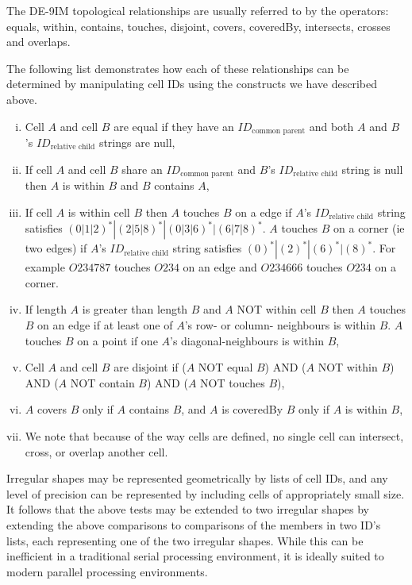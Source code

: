 \documentclass[12pt]{iopart}
\newcommand{\IDparent}{ID_{\text{common~parent}}}
\newcommand{\IDchild}{ID_{\text{relative~child}}}
\begin{document}
The DE-9IM topological relationships are usually referred to by the operators: equals, within, contains, touches, disjoint, covers, coveredBy, intersects, crosses and overlaps. 

The following list demonstrates how each of these relationships can be determined by manipulating cell IDs using the constructs we have described above.

\begin{enumerate}[(i)]
    \item Cell $A$ and cell $B$ are equal if they have an $\IDparent$ and both $A$ and $B$'s $\IDchild$ strings are null,
    \item If cell $A$ and cell $B$ share an $\IDparent$ and $B$'s $\IDchild$ string is null then $A$ is within $B$ and $B$ contains $A$, 
    \item If cell $A$ is within cell $B$ then $A$ touches $B$ on a edge if  $A$'s $\IDchild$ string satisfies $(0 | 1 | 2)^* | (2 | 5 | 8)^* | (0 | 3 | 6)^* | (6 | 7 | 8)^*$. $A$ touches $B$ on a corner (ie two edges) if $A$'s $\IDchild$ string satisfies $( 0 )^* | (2 )^* | ( 6 )^* | ( 8 )^*$. For example $O234787$ touches $O234$ on an edge and $O234666$ touches $O234$ on a corner.
    \item If length $A$ is greater than length $B$ and $A$ NOT within cell $B$ then $A$ touches $B$ on an edge if at least one of $A$'s row- or column- neighbours is within $B$.   $A$ touches $B$ on a point if one $A$'s diagonal-neighbours is within $B$,
    \item Cell $A$ and cell $B$ are disjoint if ($A$ NOT equal $B$) AND ($A$ NOT within $B$) AND ($A$ NOT contain $B$) AND ($A$ NOT touches $B$),
    \item $A$ covers $B$ only if $A$ contains $B$, and $A$ is coveredBy $B$ only if $A$ is within $B$,
    \item We note that because of the way cells are defined, no single cell can intersect, cross, or overlap another cell.
\end{enumerate}

Irregular shapes may be represented geometrically by lists of cell IDs, and any level of precision can be represented by including cells of appropriately small size. It follows that the above tests may be extended to two irregular shapes by extending the above comparisons to comparisons of the members in two ID's lists, each representing one of the two irregular shapes. While this can be inefficient in a traditional serial processing environment, it is ideally suited to modern parallel processing environments.
\end{document}
